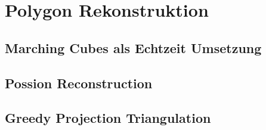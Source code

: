 \section{Polygon Rekonstruktion}




\subsection{Marching Cubes als Echtzeit Umsetzung}



\subsection{Possion Reconstruction}

\subsection{Greedy Projection Triangulation}

